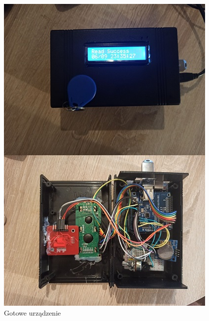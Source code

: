 \documentclass[declaration,shortabstract, mgr]{iithesis}
\begin{document}
\begin{figure}[h]
\caption{Gotowe urządzenie}
\centering
\includegraphics{arduino1.jpg}
\end{figure}
\clearpage
\end{document}
